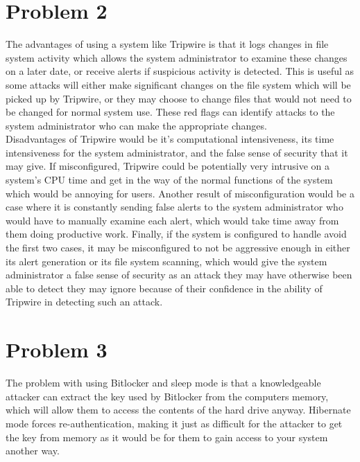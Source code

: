 \documentclass{article}
\begin{document}
\section*{Problem 2}
The advantages of using a system like Tripwire is that it logs changes in file system activity which allows the system administrator to examine these changes on a later date, or receive alerts if suspicious activity is detected. This is useful as some attacks will either make significant changes on the file system which will be picked up by Tripwire, or they may choose to change files that would not need to be changed for normal system use. These red flags can identify attacks to the system administrator who can make the appropriate changes.\\
Disadvantages of Tripwire would be it's computational intensiveness, its time intensiveness for the system administrator, and the false sense of security that it may give. If misconfigured, Tripwire could be potentially very intrusive on a system's CPU time and get in the way of the normal functions of the system which would be annoying for users. Another result of misconfiguration would be a case where it is constantly sending false alerts to the system administrator who would have to manually examine each alert, which would take time away from them doing productive work. Finally, if the system is configured to handle avoid the first two cases, it may be misconfigured to not be aggressive enough in either its alert generation or its file system scanning, which would give the system administrator a false sense of security as an attack they may have otherwise been able to detect they may ignore because of their confidence in the ability of Tripwire in detecting such an attack.\\

\section*{Problem 3}
The problem with using Bitlocker and sleep mode is that a knowledgeable attacker can extract the key used by Bitlocker from the computers memory, which will allow them to access the contents of the hard drive anyway. Hibernate mode forces re-authentication, making it just as difficult for the attacker to get the key from memory as it would be for them to gain access to your system another way.\\
\end{document}
